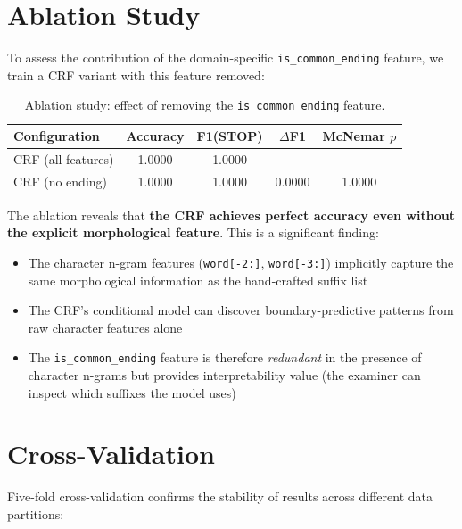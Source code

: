\documentclass[12pt, a4paper, twoside]{report}
\begin{document}
\section{Ablation Study}
\label{sec:ablation}

To assess the contribution of the domain-specific \texttt{is\_common\_ending} feature, we train a CRF variant with this feature removed:

\begin{table}[htbp]
\centering
\caption{Ablation study: effect of removing the \texttt{is\_common\_ending} feature.}
\label{tab:ablation}
\begin{tabular}{lcccc}
\toprule
\textbf{Configuration} & \textbf{Accuracy} & \textbf{F1(STOP)} & \textbf{$\Delta$F1} & \textbf{McNemar $p$} \\
\midrule
CRF (all features) & 1.0000 & 1.0000 & --- & --- \\
CRF (no ending) & 1.0000 & 1.0000 & 0.0000 & 1.0000 \\
\bottomrule
\end{tabular}
\end{table}

The ablation reveals that \textbf{the CRF achieves perfect accuracy even without the explicit morphological feature}. This is a significant finding:

\begin{itemize}
    \item The character n-gram features (\texttt{word[-2:]}, \texttt{word[-3:]}) implicitly capture the same morphological information as the hand-crafted suffix list
    \item The CRF's conditional model can discover boundary-predictive patterns from raw character features alone
    \item The \texttt{is\_common\_ending} feature is therefore \textit{redundant} in the presence of character n-grams but provides interpretability value (the examiner can inspect which suffixes the model uses)
\end{itemize}

\section{Cross-Validation}
\label{sec:cv}

Five-fold cross-validation confirms the stability of results across different data partitions:
\end{document}
